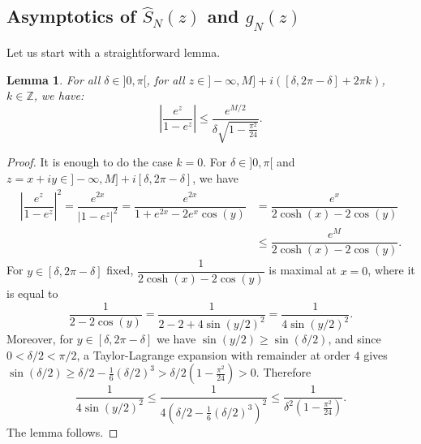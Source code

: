 \documentclass[11pt]{amsart}
\newtheorem{lem}[teo]{Lemma}
\newcommand{\mz}{\mathbb{Z}}
\begin{document}
{\subsection{Asymptotics of $\hat{S}_N(z)$ and $g_N(z)$}\label{sec:asySNfev26}

Let us start with a straightforward lemma.


\begin{lem}\label{lem:bound:exp:1-exp}
For all $\delta\in ]0,\pi[$, for all $z \in ]-\infty,M] + i([\delta, 2\pi-\delta]+2\pi k)$, $k\in \mz$, we have:
$$
\left \vert
\dfrac{e^z}{1-e^z}
\right \vert \leq \dfrac{e^{M/2}}{\delta\sqrt{1- \frac{\pi^2}{24}}}.
$$
\end{lem}

\begin{proof} It is enough to do the case $k=0$. For $\delta\in ]0,\pi[$ and $z = x+iy \in ]-\infty,M] + i[\delta, 2\pi-\delta]$, we have
 \begin{align*}
 \left\vert \dfrac{e^z}{1-e^z}
 \right \vert^2 = 
 \dfrac{e^{2x}}{|1-e^z|^2} = 
\dfrac{e^{2x}}{1+e^{2x}-2e^x \cos(y)} & = 
\dfrac{e^{x}}{2\cosh(x)-2\cos(y)} \\ & \leq 
 \dfrac{e^M}{2\cosh(x)-2\cos(y)}.
 \end{align*}
For $y \in [\delta,2\pi-\delta]$ fixed, 
$\dfrac{1}{2\cosh(x)-2\cos(y)}$ is maximal at $x=0$, where it is equal to
$$\dfrac{1}{2-2\cos(y)}
= \dfrac{1}{2-2+4\sin(y/2)^2}
= \dfrac{1}{4 \sin(y/2)^2} .
$$
Moreover, for $y\in [\delta,2\pi-\delta]$ we have $\sin(y/2)\geq \sin(\delta/2)$, and since $0<\delta/2 <\pi/2$, a Taylor-Lagrange expansion with remainder at order $4$ gives $\textstyle \sin(\delta/2) \geq \delta/2 - \frac{1}{6}(\delta/2)^3>\delta/2\left (1-\frac{\pi^2}{24}\right )>0$. Therefore
$$\dfrac{1}{4 \sin(y/2)^2} \leq \dfrac{1}{4(\delta/2 - \frac{1}{6}(\delta/2)^3)^2} \leq \dfrac{1}{\delta^2(1- \frac{\pi^2}{24})}.$$
The lemma follows.
\end{proof}
 
}
\end{document}
